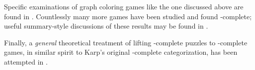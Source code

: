 \begin{itemize}
    Specific examinations of graph coloring games like the one discussed above
    are found in
    \textcite{bodlaender.coloring,bh.placement,kbd.impartial,cpss.coloring}.
    Countlessly many more games have been studied and found \PSPACE-complete;
    useful summary-style discussions of these results may be found in
    \textcite{eppstein.cgt,demaine.acgt}.

    Finally, a \emph{general} theoretical treatment of lifting \NP-complete
    puzzles to \PSPACE-complete games, in similar spirit to Karp's original
    \NP-complete categorization, has been attempted in
    \textcite{schaefer.deriving,schaefer.games}.

\end{itemize}




